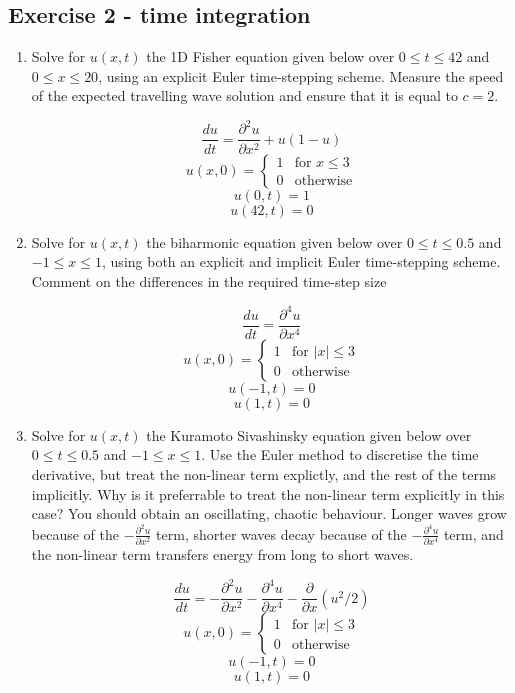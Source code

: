 \documentclass[a4paper]{article}
\begin{document}
\subsection*{Exercise 2 - time integration}

\begin{enumerate}[label=\alph*.]
  \item Solve for $u(x, t)$ the 1D Fisher equation given below over $0 \le t \le 42$ and $0 \le x \le
  20$, using an explicit Euler time-stepping
  scheme. Measure the speed of the expected travelling wave solution and ensure that it
    is equal to $c=2$.

    $$ \frac{du}{dt} = \frac{\partial^2 u}{\partial x^2} + u (1-u)$$
    $$ u(x,0) = \begin{cases} 
                    1 & \text{for } x \le 3 \\ 
                    0 & \text{otherwise}
                \end{cases}
    $$
    $$u(0, t) = 1$$
    $$u(42, t) = 0$$


  \item Solve for $u(x,t)$ the biharmonic equation given below over $0 \le t \le 0.5$ and
    $-1 \le x \le 1$, using both an explicit and implicit Euler time-stepping scheme.
    Comment on the differences in the required time-step size

    $$\frac{du}{dt} = \frac{\partial^4 u}{\partial x^4}$$
    $$ u(x,0) = \begin{cases} 
                    1 & \text{for } |x| \le 3 \\ 
                    0 & \text{otherwise}
                \end{cases}
    $$
    $$u(-1, t) = 0$$
    $$u(1, t) = 0$$

  \item Solve for $u(x,t)$ the Kuramoto Sivashinsky equation given below over $0 \le t
    \le 0.5$ and $-1 \le x \le 1$. Use the Euler method to discretise the time derivative,
    but treat the non-linear term explictly, and the rest of the terms implicitly. Why is it
    preferrable to treat the non-linear term explicitly in this case? You should obtain
    an oscillating, chaotic behaviour. Longer waves grow because of the
    $-\frac{\partial^2 u}{\partial x^2}$ term, shorter waves decay because of the
    $-\frac{\partial^4 u}{\partial x^4}$ term, and the non-linear term transfers energy
    from long to short waves.

    $$\frac{du}{dt} = -\frac{\partial^2 u}{\partial x^2} - \frac{\partial^4 u}{\partial
    x^4} - \frac{\partial}{\partial x} (u^2/2)$$
    $$ u(x,0) = \begin{cases} 
                    1 & \text{for } |x| \le 3 \\ 
                    0 & \text{otherwise}
                \end{cases}
    $$
    $$u(-1, t) = 0$$
    $$u(1, t) = 0$$
\end{enumerate}

 
\end{document}
